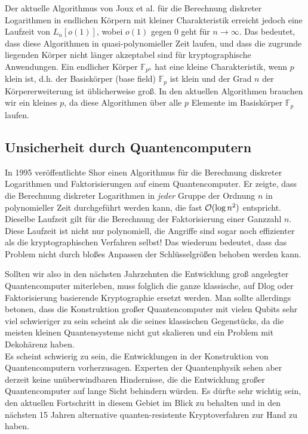 \begin{refsegment}
Der aktuelle Algorithmus von Joux et al. für die Berechnung diskreter Logarithmen in endlichen Körpern mit kleiner Charakteristik erreicht jedoch eine Laufzeit von $L_n[o(1)]$, wobei $o(1)$ gegen $0$ geht für $n \to \infty$. Das bedeutet, dass diese Algorithmen in quasi-polynomieller Zeit laufen, und dass die zugrunde liegenden Körper nicht länger akzeptabel sind für kryptographische Anwendungen. Ein endlicher Körper $\mathbb{F}_{p^n}$ hat eine kleine Charakteristik, wenn $p$ klein ist, d.h. der Basiskörper (base field) $\mathbb{F}_p$ ist klein und der Grad $n$ der Körpererweiterung ist üblicherweise groß. In den aktuellen Algorithmen brauchen wir ein kleines $p$, da diese Algorithmen über alle $p$ Elemente im Basiskörper $\mathbb{F}_p$ laufen.


\subsection{Unsicherheit durch Quantencomputern}
In 1995 veröffentlichte Shor einen Algorithmus für die Berechnung diskreter Logarithmen und Faktorisierungen auf einem Quantencomputer. Er zeigte, dass die Berechnung diskreter Logarithmen in {\em jeder} Gruppe der Ordnung $n$ in polynomieller Zeit durchgeführt werden kann, die fast ${\cal O}(\log n^2)$ entspricht. Dieselbe Laufzeit gilt für die Berechnung der Faktorisierung einer Ganzzahl $n$. Diese Laufzeit ist nicht nur polynomiell, die Angriffe sind sogar noch effizienter als die kryptographischen Verfahren selbst! Das wiederum bedeutet, dass das Problem nicht durch bloßes Anpassen der Schlüsselgrößen behoben werden kann.

Sollten wir also in den nächsten Jahrzehnten die Entwicklung groß angelegter Quantencomputer miterleben, muss folglich die ganze klassische, auf Dlog oder Faktorisierung basierende Kryptographie ersetzt werden. Man sollte allerdings betonen, dass die Konstruktion großer Quantencomputer mit vielen Qubits sehr viel schwieriger zu sein scheint als die seines klassischen Gegenstücks, da die meisten kleinen Quantensysteme nicht gut skalieren und ein Problem mit Dekohärenz haben.\\[0.1cm]

 Es scheint schwierig zu sein, die Entwicklungen in der Konstruktion von Quantencomputern vorherzusagen. Experten der Quantenphysik sehen aber derzeit keine unüberwindbaren Hindernisse, die die Entwicklung großer Quantencomputer auf lange Sicht behindern würden. Es dürfte sehr wichtig sein, den aktuellen Fortschritt in diesem Gebiet im Blick zu behalten und in den nächsten 15 Jahren alternative quanten-resistente Kryptoverfahren zur Hand zu haben.\\[0.1cm]


\end{refsegment}
